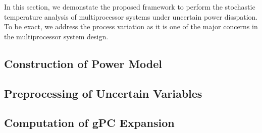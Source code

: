 In this section, we demonstate the proposed framework to perform the stochastic temperature analysis of multiprocessor systems under uncertain power disspation. To be exact, we address the process variation as it is one of the major concerns in the multiprocessor system design.

\subsection{Construction of Power Model}


\subsection{Preprocessing of Uncertain Variables} 


\subsection{Computation of gPC Expansion} 

